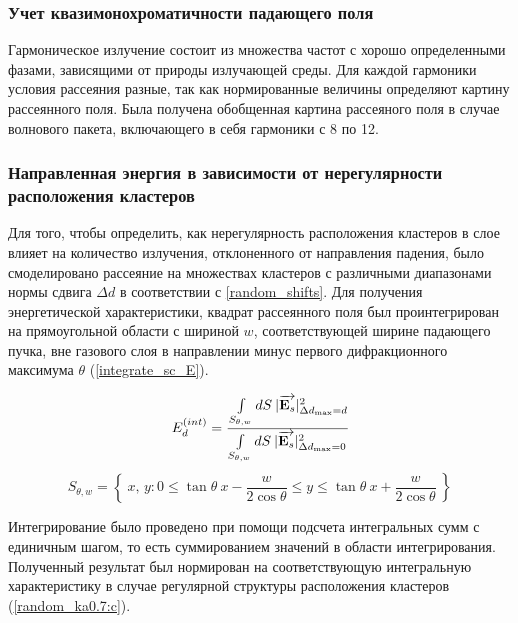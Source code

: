 \subsubsection{Учет квазимонохроматичности падающего поля}

Гармоническое излучение состоит из множества частот с хорошо определенными фазами, зависящими от природы излучающей среды. Для каждой гармоники условия рассеяния разные, так как нормированные величины определяют картину рассеянного поля. Была получена обобщенная картина рассеяного поля в случае волнового пакета, включающего в себя гармоники с 8 по 12.

\subsubsection{Направленная энергия в зависимости от нерегулярности расположения кластеров}

Для того, чтобы определить, как нерегулярность расположения кластеров в слое влияет на количество излучения, отклоненного от направления падения, было смоделировано рассеяние на множествах кластеров с различными диапазонами нормы сдвига $\Delta d$ в соответствии с \autoref{random_shifts}. Для получения энергетической характеристики, квадрат рассеянного поля был проинтегрирован на прямоугольной области с шириной $w$, соответствующей ширине падающего пучка, вне газового слоя в направлении минус первого дифракционного максимума $\theta$ (\autoref{integrate_sc_E}).

    \begin{equation}
        E^{(int)}_{d} = \cfrac{\int \limits_{S_{\theta, w}} dS\:|\overrightarrow{\textbf{E}_{s}}|^2_{\Delta d_{\max} = d}}{\int \limits_{S_{\theta, w}} dS\:|\overrightarrow{\textbf{E}_{s}}|^2_{\Delta d_{\max} = 0} }
        \label{integrate_sc_E}
    \end{equation}
    \begin{equation}
        S_{\theta, w} = \left\{\:x,\,y : 0 \leq \tan{\theta}\:x - \frac{w}{2\cos{\theta}} \leq y \leq \tan{\theta}\:x + \frac{w}{2\cos{\theta}} \:\right\}
        \label{integrate_sc_E_sub}
    \end{equation}

Интегрирование было проведено при помощи подсчета интегральных сумм с единичным шагом, то есть суммированием значений в области интегрирования. Полученный результат был нормирован на соответствующую интегральную характеристику в случае регулярной структуры расположения кластеров (\autoref{random_ka0.7:c}).

